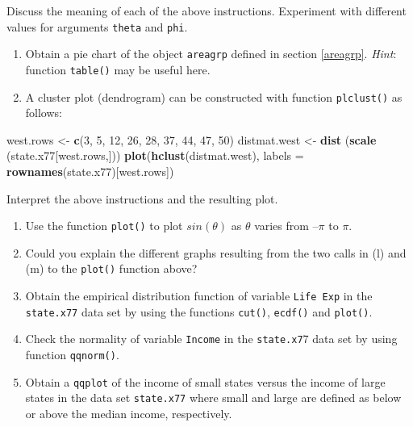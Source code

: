 \documentclass[
]{book}
\newenvironment{Shaded}{\begin{snugshade}}{\end{snugshade}}
\newcommand{\AttributeTok}[1]{\textcolor[rgb]{0.13,0.29,0.53}{#1}}
\newcommand{\DecValTok}[1]{\textcolor[rgb]{0.00,0.00,0.81}{#1}}
\newcommand{\FunctionTok}[1]{\textcolor[rgb]{0.13,0.29,0.53}{\textbf{#1}}}
\newcommand{\NormalTok}[1]{#1}
\newcommand{\OtherTok}[1]{\textcolor[rgb]{0.56,0.35,0.01}{#1}}
\begin{document}
Discuss the meaning of each of the above instructions. Experiment with different values for arguments \texttt{theta} and \texttt{phi}.

\begin{enumerate}
\def\labelenumi{(\alph{enumi})}
\setcounter{enumi}{10}
\item
  Obtain a pie chart of the object \texttt{areagrp} defined in section \ref{areagrp}. \emph{Hint}: function \texttt{table()} may be useful here.
\item
  A cluster plot (dendrogram) can be constructed with function \texttt{plclust()} as follows:
\end{enumerate}

\begin{Shaded}
\begin{Highlighting}[]
\NormalTok{west.rows }\OtherTok{\textless{}{-}} \FunctionTok{c}\NormalTok{(}\DecValTok{3}\NormalTok{, }\DecValTok{5}\NormalTok{, }\DecValTok{12}\NormalTok{, }\DecValTok{26}\NormalTok{, }\DecValTok{28}\NormalTok{, }\DecValTok{37}\NormalTok{, }\DecValTok{44}\NormalTok{, }\DecValTok{47}\NormalTok{, }\DecValTok{50}\NormalTok{)}
\NormalTok{distmat.west }\OtherTok{\textless{}{-}} \FunctionTok{dist}\NormalTok{ (}\FunctionTok{scale}\NormalTok{ (state.x77[west.rows,]))}
\FunctionTok{plot}\NormalTok{(}\FunctionTok{hclust}\NormalTok{(distmat.west), }\AttributeTok{labels =} \FunctionTok{rownames}\NormalTok{(state.x77)[west.rows])}
\end{Highlighting}
\end{Shaded}

Interpret the above instructions and the resulting plot.

\begin{enumerate}
\def\labelenumi{(\alph{enumi})}
\setcounter{enumi}{12}
\item
  Use the function \texttt{plot()} to plot \(sin (\theta)\) as \(\theta\) varies from \(–\pi\) to \(\pi\).
\item
  Could you explain the different graphs resulting from the two calls in (l) and (m) to the \texttt{plot()} function above?
\item
  Obtain the empirical distribution function of variable \texttt{Life\ Exp} in the \texttt{state.x77} data set by using the functions \texttt{cut()}, \texttt{ecdf()} and \texttt{plot()}.
\item
  Check the normality of variable \texttt{Income} in the \texttt{state.x7}7 data set by using function \texttt{qqnorm()}.
\item
  Obtain a \texttt{qqplot} of the income of small states versus the income of large states in the data set \texttt{state.x77} where small and large are defined as below or above the median income, respectively.
\end{enumerate}
\end{document}
